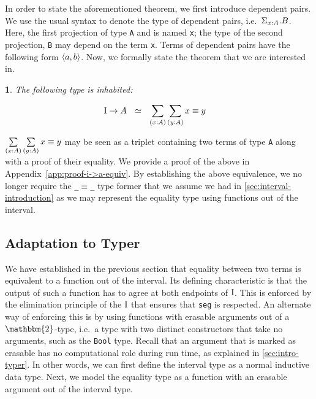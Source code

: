 \documentclass[12pt,twoside,maitrise]{dms}
\newtheorem{theo}[cor]{\theoremname}
\theoremstyle{definition}
\numberwithin{equation}{section}
\numberwithin{table}{chapter}
\numberwithin{figure}{chapter}
\newcommand\id[1] {\texttt{#1}}
\newcommand\fn[1] {\texttt{#1}}
\begin{document}
In order to state the aforementioned theorem, we first introduce dependent
pairs. We use the usual syntax to denote the type of dependent pairs,
i.e.\ $\Sigma_{\oftype{x}{A}}. B$. Here, the first projection of type \id{A} and
is named \id{x}; the type of the second projection, \id{B} may depend on the
term \id{x}. Terms of dependent pairs have the following form $\braket{a, b}$.
Now, we formally state the theorem that we are interested in.

\begin{theo}\label{theo:i->a-equiv}
The following type is inhabited:

\begin{align}
  & \bI \rightarrow A \ \ \simeq \ \ \sum\limits_{(\oftype{x}{A})} \sum\limits_{(\oftype{y}{A})} \eqtype{x}{y}\nonumber
\end{align}

\end{theo}

$\sum\limits_{(\oftype{x}{A})} \sum\limits_{(\oftype{y}{A})}
\eqtype{x}{y}\nonumber$ may be seen as a triplet containing two terms of type
\id{A} along with a proof of their equality. We provide a proof of the above in
Appendix~\ref{app:proof-i->a-equiv}. By establishing the above equivalence, we
no longer require the \fn{_$\equiv$_} type former that we assume we had in
\autoref{sec:interval-introduction} as we may represent the equality type using
functions out of the interval.

\subsection{Adaptation to Typer}\label{sec:eq-justification}

We have established in the previous section that equality between two terms is
equivalent to a function out of the interval. Its defining characteristic is
that the output of such a function has to agree at both endpoints of $\mathrm{I}$.
This is enforced by the elimination principle of the $\mathrm{I}$ that ensures that
\id{seg} is respected. An alternate way of enforcing this is by using functions
with erasable arguments out of a $\mathbbm{2}$-type, i.e.\ a type with two
distinct constructors that take no arguments, such as the \id{Bool} type.
Recall that an argument that is marked as erasable has no computational role
during run time, as explained in \autoref{sec:intro-typer}. In other words, we
can first define the interval type as a normal inductive data type. Next, we
model the equality type as a function with an erasable argument out of the
interval type.
\end{document}
